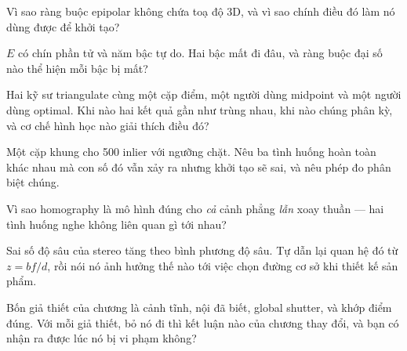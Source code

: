 \documentclass[../../vslam.tex]{subfiles}
\begin{document}
\begin{tukiem}
\item Vì sao ràng buộc epipolar không chứa toạ độ \(3\)D, và vì sao chính điều đó làm nó dùng được để khởi tạo?
\item \(E\) có chín phần tử và năm bậc tự do. Hai bậc mất đi đâu, và ràng buộc đại số nào thể hiện mỗi bậc bị mất?
\item Hai kỹ sư triangulate cùng một cặp điểm, một người dùng midpoint và một người dùng optimal. Khi nào hai kết quả gần như trùng nhau, khi nào chúng phân kỳ, và cơ chế hình học nào giải thích điều đó?
\item Một cặp khung cho 500 inlier với ngưỡng chặt. Nêu ba tình huống hoàn toàn khác nhau mà con số đó vẫn xảy ra nhưng khởi tạo sẽ sai, và nêu phép đo phân biệt chúng.
\item Vì sao homography là mô hình đúng cho \emph{cả} cảnh phẳng \emph{lẫn} xoay thuần --- hai tình huống nghe không liên quan gì tới nhau?
\item Sai số độ sâu của stereo tăng theo bình phương độ sâu. Tự dẫn lại quan hệ đó từ \(z = bf/d\), rồi nói nó ảnh hưởng thế nào tới việc chọn đường cơ sở khi thiết kế sản phẩm.
\item Bốn giả thiết của chương là cảnh tĩnh, nội đã biết, global shutter, và khớp điểm đúng. Với mỗi giả thiết, bỏ nó đi thì kết luận nào của chương thay đổi, và bạn có nhận ra được lúc nó bị vi phạm không?
\end{tukiem}
\ifSubfilesClassLoaded{\printbibliography[title={Nguồn}]}{}
\end{document}
